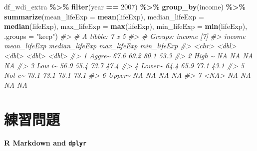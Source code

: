 \documentclass[
  xelatex, ja=standard]{bxjsbook}
\newenvironment{Shaded}{\begin{snugshade}}{\end{snugshade}}
\newcommand{\AttributeTok}[1]{\textcolor[rgb]{0.13,0.29,0.53}{#1}}
\newcommand{\CommentTok}[1]{\textcolor[rgb]{0.56,0.35,0.01}{\textit{#1}}}
\newcommand{\DecValTok}[1]{\textcolor[rgb]{0.00,0.00,0.81}{#1}}
\newcommand{\FunctionTok}[1]{\textcolor[rgb]{0.13,0.29,0.53}{\textbf{#1}}}
\newcommand{\NormalTok}[1]{#1}
\newcommand{\SpecialCharTok}[1]{\textcolor[rgb]{0.81,0.36,0.00}{\textbf{#1}}}
\newcommand{\StringTok}[1]{\textcolor[rgb]{0.31,0.60,0.02}{#1}}
\theoremstyle{definition}
\theoremstyle{definition}
\theoremstyle{definition}
\theoremstyle{definition}
\theoremstyle{remark}
\begin{document}
\begin{Shaded}
\begin{Highlighting}[]
\NormalTok{df\_wdi\_extra }\SpecialCharTok{\%\textgreater{}\%} \FunctionTok{filter}\NormalTok{(year }\SpecialCharTok{==} \DecValTok{2007}\NormalTok{) }\SpecialCharTok{\%\textgreater{}\%} 
  \FunctionTok{group\_by}\NormalTok{(income) }\SpecialCharTok{\%\textgreater{}\%} 
  \FunctionTok{summarize}\NormalTok{(}\AttributeTok{mean\_lifeExp =} \FunctionTok{mean}\NormalTok{(lifeExp), }\AttributeTok{median\_lifeExp =} \FunctionTok{median}\NormalTok{(lifeExp), }\AttributeTok{max\_lifeExp =} \FunctionTok{max}\NormalTok{(lifeExp), }\AttributeTok{min\_lifeExp =} \FunctionTok{min}\NormalTok{(lifeExp), }\AttributeTok{.groups =} \StringTok{"keep"}\NormalTok{)}
\CommentTok{\#\textgreater{} \# A tibble: 7 x 5}
\CommentTok{\#\textgreater{} \# Groups:   income [7]}
\CommentTok{\#\textgreater{}   income mean\_lifeExp median\_lifeExp max\_lifeExp min\_lifeExp}
\CommentTok{\#\textgreater{}   \textless{}chr\textgreater{}         \textless{}dbl\textgreater{}          \textless{}dbl\textgreater{}       \textless{}dbl\textgreater{}       \textless{}dbl\textgreater{}}
\CommentTok{\#\textgreater{} 1 Aggre\textasciitilde{}         67.6           69.2        80.1        53.3}
\CommentTok{\#\textgreater{} 2 High \textasciitilde{}         NA             NA          NA          NA  }
\CommentTok{\#\textgreater{} 3 Low i\textasciitilde{}         56.9           55.4        73.7        47.4}
\CommentTok{\#\textgreater{} 4 Lower\textasciitilde{}         64.4           65.9        77.1        43.1}
\CommentTok{\#\textgreater{} 5 Not c\textasciitilde{}         73.1           73.1        73.1        73.1}
\CommentTok{\#\textgreater{} 6 Upper\textasciitilde{}         NA             NA          NA          NA  }
\CommentTok{\#\textgreater{} 7 \textless{}NA\textgreater{}           NA             NA          NA          NA}
\end{Highlighting}
\end{Shaded}

\hypertarget{ux7df4ux7fd2ux554fux984c}{%
\section{練習問題}\label{ux7df4ux7fd2ux554fux984c}}

\textbf{R Markdown and \texttt{dplyr}}
\end{document}
